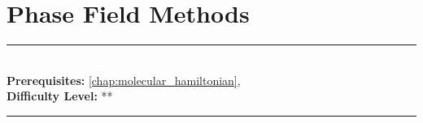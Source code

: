\documentclass[book.tex]{subfiles}
\begin{document}
\chapter{Phase Field Methods}
\label{chap:phase_field_methods}
\noindent\rule{11cm}{0.4pt} \\
\textbf{Prerequisites:} \autoref{chap:molecular_hamiltonian},  \\
\textbf{Difficulty Level:} ** \\
\noindent\rule{11cm}{0.4pt}
\vspace{5mm}
\end{document}
